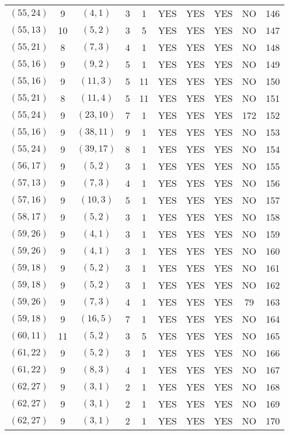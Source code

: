 \begin{longtable}{|c|c|c|c|c|c|c|c|c|c|}
$(55, 24)$ & 9 & $(4, 1)$ & 3 & 1 & YES & YES & YES & NO & 146\\
$(55, 13)$ & 10 & $(5, 2)$ & 3 & 5 & YES & YES & YES & NO & 147\\
$(55, 21)$ & 8 & $(7, 3)$ & 4 & 1 & YES & YES & YES & NO & 148\\
$(55, 16)$ & 9 & $(9, 2)$ & 5 & 1 & YES & YES & YES & NO & 149\\
$(55, 16)$ & 9 & $(11, 3)$ & 5 & 11 & YES & YES & YES & NO & 150\\
$(55, 21)$ & 8 & $(11, 4)$ & 5 & 11 & YES & YES & YES & NO & 151\\
$(55, 24)$ & 9 & $(23, 10)$ & 7 & 1 & YES & YES & YES & 172 & 152\\
$(55, 16)$ & 9 & $(38, 11)$ & 9 & 1 & YES & YES & YES & NO & 153\\
$(55, 24)$ & 9 & $(39, 17)$ & 8 & 1 & YES & YES & YES & NO & 154\\
$(56, 17)$ & 9 & $(5, 2)$ & 3 & 1 & YES & YES & YES & NO & 155\\
$(57, 13)$ & 9 & $(7, 3)$ & 4 & 1 & YES & YES & YES & NO & 156\\
$(57, 16)$ & 9 & $(10, 3)$ & 5 & 1 & YES & YES & YES & NO & 157\\
$(58, 17)$ & 9 & $(5, 2)$ & 3 & 1 & YES & YES & YES & NO & 158\\
$(59, 26)$ & 9 & $(4, 1)$ & 3 & 1 & YES & YES & YES & NO & 159\\
$(59, 26)$ & 9 & $(4, 1)$ & 3 & 1 & YES & YES & YES & NO & 160\\
$(59, 18)$ & 9 & $(5, 2)$ & 3 & 1 & YES & YES & YES & NO & 161\\
$(59, 18)$ & 9 & $(5, 2)$ & 3 & 1 & YES & YES & YES & NO & 162\\
$(59, 26)$ & 9 & $(7, 3)$ & 4 & 1 & YES & YES & YES & 79 & 163\\
$(59, 18)$ & 9 & $(16, 5)$ & 7 & 1 & YES & YES & YES & NO & 164\\
$(60, 11)$ & 11 & $(5, 2)$ & 3 & 5 & YES & YES & YES & NO & 165\\
$(61, 22)$ & 9 & $(5, 2)$ & 3 & 1 & YES & YES & YES & NO & 166\\
$(61, 22)$ & 9 & $(8, 3)$ & 4 & 1 & YES & YES & YES & NO & 167\\
$(62, 27)$ & 9 & $(3, 1)$ & 2 & 1 & YES & YES & YES & NO & 168\\
$(62, 27)$ & 9 & $(3, 1)$ & 2 & 1 & YES & YES & YES & NO & 169\\
$(62, 27)$ & 9 & $(3, 1)$ & 2 & 1 & YES & YES & YES & NO & 170\\

\end{longtable}
